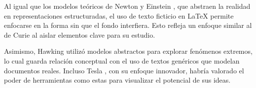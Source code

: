 \documentclass[11pt,letterpaper]{article}
\begin{document}
Al igual que los modelos teóricos de Newton \cite{newton1687principia} y Einstein \cite{einstein1921relativity}, que abstraen la realidad en representaciones estructuradas, el uso de texto ficticio en LaTeX permite enfocarse en la forma sin que el fondo interfiera. Esto refleja un enfoque similar al de Curie \cite{curie1935radioactivity} al aislar elementos clave para su estudio.

Asimismo, Hawking \cite{hawking1974blackholes} utilizó modelos abstractos para explorar fenómenos extremos, lo cual guarda relación conceptual con el uso de textos genéricos que modelan documentos reales. Incluso Tesla \cite{tesla1900wireless}, con su enfoque innovador, habría valorado el poder de herramientas como estas para visualizar el potencial de sus ideas.

\bigskip



\end{document}
